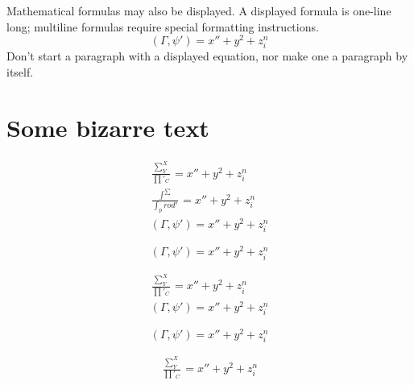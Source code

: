 \documentclass[twocolumn]{article}
\newcommand{\ip}[2]{(#1, #2)}
\begin{document}
Mathematical formulas may also be displayed. A displayed formula is
one-line long; multiline formulas require special formatting
instructions.
\[ \ip{\Gamma}{\psi'} = x'' + y^{2} + z_{i}^{n}\] 
Don't start a paragraph with a displayed equation, nor make one a
paragraph by itself.

\section{Some bizarre text}

\lipsum[1]
\begin{gridenv}
\begin{eqnarray}
\frac{\sum^X_Y}{\prod'_C} = x'' + y^{2} + z_{i}^{n}\label{eq2}\\
\frac{\int^\sum}{\int_prod'} = x'' + y^{2} + z_{i}^{n}\label{eq3}\\
\ip{\Gamma}{\psi'} = x'' + y^{2} + z_{i}^{n}\label{eq4}
\end{eqnarray}
\end{gridenv}
\lipsum[2]
\begin{gridenv}
\begin{equation}
\ip{\Gamma}{\psi'} = x'' + y^{2} + z_{i}^{n}\label{eq1}
\end{equation}
\end{gridenv}
\lipsum[3]
\begin{gridenv}
\begin{eqnarray}
\frac{\sum^X_Y}{\prod'_C} = x'' + y^{2} + z_{i}^{n}\label{eq2}\\
\ip{\Gamma}{\psi'} = x'' + y^{2} + z_{i}^{n}\label{eq4}
\end{eqnarray}
\end{gridenv}
\lipsum[4]
\begin{gridenv}
\begin{equation}
\ip{\Gamma}{\psi'} = x'' + y^{2} + z_{i}^{n}\label{eq1}
\end{equation}
\end{gridenv}
\lipsum[5]
\begin{gridenv}
\begin{eqnarray}
\frac{\sum^X_Y}{\prod'_C} = x'' + y^{2} + z_{i}^{n}\label{eq2}
\end{eqnarray}
\end{gridenv}
\end{document}
